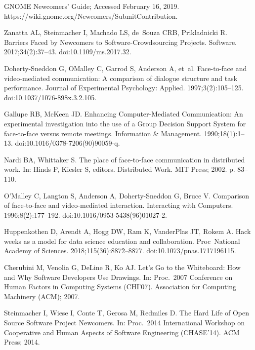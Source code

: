 \documentclass[10pt,letterpaper]{article}
\begin{document}
\begin{thebibliography}{10}
GNOME Newcomers' Guide; Accessed February 16, 2019.
\newblock https://wiki.gnome.org/Newcomers/SubmitContribution.

Zanatta AL, Steinmacher I, Machado LS, de~Souza CRB, Prikladnicki R.
\newblock Barriers Faced by Newcomers to Software-Crowdsourcing Projects.
 Software. 2017;34(2):37--43.
\newblock doi:{10.1109/ms.2017.32}.

Doherty-Sneddon G, O{\textquotesingle}Malley C, Garrod S, Anderson A, et~al.
\newblock Face-to-face and video-mediated communication: A comparison of
  dialogue structure and task performance.
\newblock Journal of Experimental Psychology: Applied. 1997;3(2):105--125.
\newblock doi:{10.1037/1076-898x.3.2.105}.

Gallupe RB, McKeen JD.
\newblock Enhancing Computer-Mediated Communication: An experimental
  investigation into the use of a Group Decision Support System for
  face-to-face versus remote meetings.
\newblock Information {\&} Management. 1990;18(1):1--13.
\newblock doi:{10.1016/0378-7206(90)90059-q}.

Nardi BA, Whittaker S.
\newblock The place of face-to-face communication in distributed work.
\newblock In: Hinds P, Kiesler S, editors. Distributed Work. {MIT} Press; 2002.
  p. 83--110.

O'Malley C, Langton S, Anderson A, Doherty-Sneddon G, Bruce V.
\newblock Comparison of face-to-face and video-mediated interaction.
\newblock Interacting with Computers. 1996;8(2):177--192.
\newblock doi:{10.1016/0953-5438(96)01027-2}.

Huppenkothen D, Arendt A, Hogg DW, Ram K, VanderPlas JT, Rokem A.
\newblock Hack weeks as a model for data science education and collaboration.
\newblock Proc\ National Academy of Sciences. 2018;115(36):8872--8877.
\newblock doi:{10.1073/pnas.1717196115}.

Cherubini M, Venolia G, DeLine R, Ko AJ.
\newblock Let's Go to the Whiteboard: How and Why Software Developers Use
  Drawings.
\newblock In: Proc.\ 2007 Conference on Human Factors in Computing Systems
  ({CHI'07}). Association for Computing Machinery ({ACM}); 2007.

Steinmacher I, Wiese I, Conte T, Gerosa M, Redmiles D.
\newblock The Hard Life of Open Source Software Project Newcomers.
\newblock In: Proc.\ 2014 International Workshop on Cooperative and Human
  Aspects of Software Engineering ({CHASE'14}). {ACM} Press; 2014.


\end{thebibliography}
\end{document}

